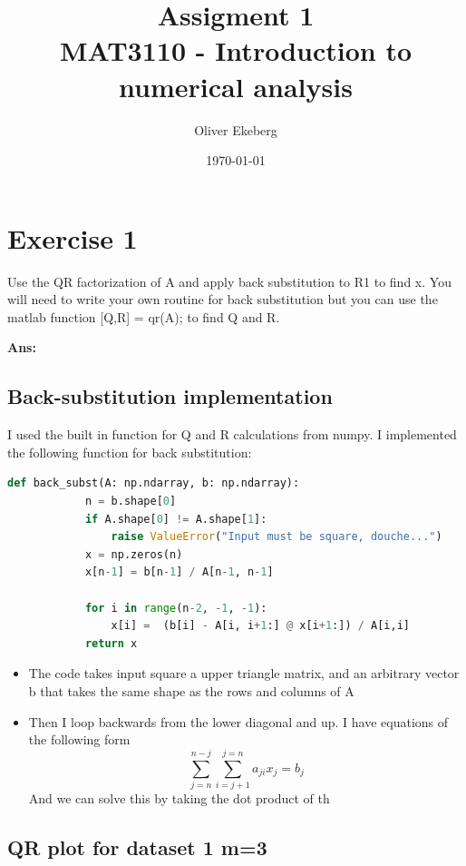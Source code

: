 \documentclass[11pt]{article}
\title{Assigment 1 \\ MAT3110 - Introduction to numerical analysis}
\author{Oliver Ekeberg}
\date{\today}
\newenvironment{solbox}
  {\begin{mdframed}[linewidth=1pt,linecolor=black,roundcorner=5pt]
   \noindent\textbf{Ans: }\enspace}
  {\end{mdframed}}
\begin{document}
\maketitle


\tableofcontents

\section{Exercise 1}

Use the QR factorization of A and apply back substitution to R1 to
find x. You will need to write your own routine for back substitution
but you can use the matlab function
[Q,R] = qr(A);
to find Q and R.


\begin{solbox}

    \subsection{Back-substitution implementation}
    

    I used the built in function for Q and R calculations from numpy. I implemented the following function for back substitution:

    \begin{lstlisting}[language=Python]
        def back_subst(A: np.ndarray, b: np.ndarray):
            n = b.shape[0]
            if A.shape[0] != A.shape[1]:
                raise ValueError("Input must be square, douche...")
            x = np.zeros(n)
            x[n-1] = b[n-1] / A[n-1, n-1]

            for i in range(n-2, -1, -1):
                x[i] =  (b[i] - A[i, i+1:] @ x[i+1:]) / A[i,i]
            return x
    \end{lstlisting}
    \begin{itemize}
        \item The code takes input square a upper triangle matrix, and an arbitrary vector b that takes the same shape as the rows and columns of A
        \item Then I loop backwards from the lower diagonal and up. I have equations of the following form
        \[
            \sum_{ j=n }^{ n-j } \sum_{ i=j+1 }^{ j=n } a_{ji} x_j = b_j 
        \]
        And we can solve this by taking the dot product of th
        
    
    \end{itemize}
    


    \subsection{QR plot for dataset 1 m=3}
    

\end{solbox}
\end{document}
